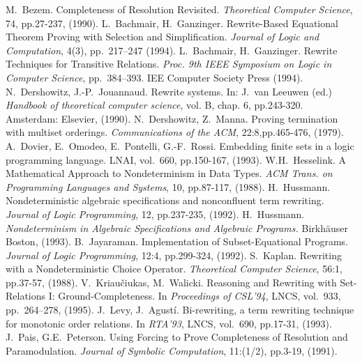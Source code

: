 \begin{thebibliography}{MM99}
 M.~Bezem. 
   Completeness of Resolution Revisited. 
   {\it Theoretical Computer Science}, 74, pp.27-237, (1990).
 L.~Bachmair, H.~Ganzinger. 
   Rewrite-Based Equational Theorem Proving with Selection and
   Simplification. {\it Journal of Logic and Computation}, 4(3),
   pp.~217--247 (1994).
 L.~Bachmair, H.~Ganzinger. 
   Rewrite Techniques for Transitive Relations.
   {\it Proc. 9th IEEE Symposium on Logic in Computer Science}, pp.~384--393.
   IEE Computer Society Press (1994).
 N.~Dershowitz, J.-P.~Jouannaud. 
   Rewrite systems. In: J.~van Leeuwen (ed.)  {\it Handbook of
   theoretical computer science}, vol. B, chap. 6,
   pp.243-320. Amsterdam: Elsevier, (1990).
 N.~Dershowitz, Z.~Manna. 
   Proving termination with multiset orderings. 
   {\it Communications of the ACM}, 22:8,pp.465-476, (1979).
 A.~Dovier, E.~Omodeo, E.~Pontelli, G.-F.~Rossi. 
   Embedding finite sets in a logic programming language. 
   LNAI, vol.~660, pp.150-167, (1993).
 W.H.~Hesselink. A Mathematical Approach to Nondeterminism
   in Data Types. {\it ACM Trans. on Programming Languages and Systems},
   10, pp.87-117, (1988).
 H.~Hussmann. Nondeterministic algebraic
   specifications and nonconfluent term rewriting. {\it Journal of Logic
   Programming}, 12, pp.237-235, (1992).
 H.~Hussmann. 
   {\it Nondeterminism in Algebraic Specifications and Algebraic Programs.}
   Birkh\"auser Boston, (1993).
 B.~Jayaraman. Implementation of Subset-Equational 
   Programs. {\it Journal of Logic Programming}, 12:4, pp.299-324, (1992).
 S.~Kaplan. Rewriting with a Nondeterministic Choice
   Operator. {\it Theoretical Computer Science}, 56:1, pp.37-57, (1988).
 V.~Kriau\v ciukas, M.~Walicki.  Reasoning and Rewriting
   with Set-Relations I: Ground-Completeness.  In {\it Proceedings of
   CSL'94}, LNCS, vol.~933, pp.~264--278, (1995).
 J.~Levy, J.~Agust\'i. Bi-rewriting, a term rewriting
   technique for monotonic order relations. In {\it RTA'93}, LNCS, 
   vol.~690, pp.17-31, (1993).
 J.~Pais, G.E.~Peterson. Using Forcing to Prove Completeness
   of Resolution and Paramodulation. {\it Journal of Symbolic Computation}, 
   11:(1/2), pp.3-19, (1991).

\end{thebibliography}
